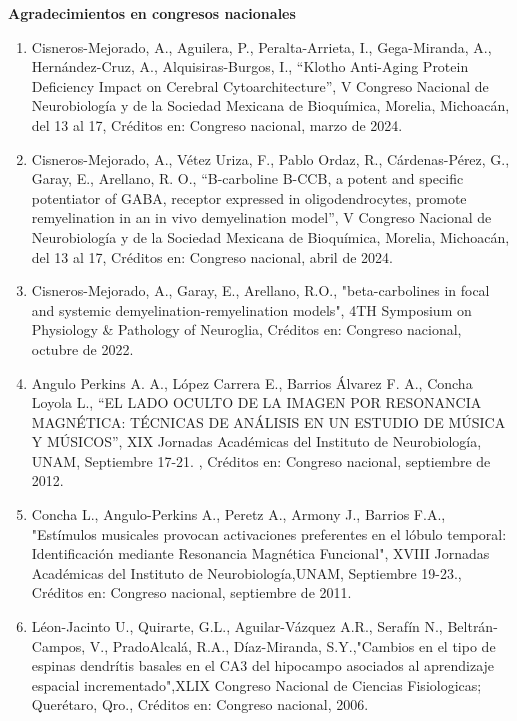 \textbf{Agradecimientos en congresos nacionales}

\hfill

\begin{enumerate}

\item Cisneros-Mejorado, A., Aguilera, P., Peralta-Arrieta, I., Gega-Miranda, A., Hernández-Cruz, A., Alquisiras-Burgos, I., 
“Klotho Anti-Aging Protein Deficiency Impact on Cerebral Cytoarchitecture”, V Congreso Nacional de Neurobiología y de la 
Sociedad Mexicana de Bioquímica, Morelia, Michoacán, del 13 al 17, Créditos en: Congreso nacional, marzo de 2024.

\item Cisneros-Mejorado, A., Vétez Uriza, F., Pablo Ordaz, R., Cárdenas-Pérez, G., Garay, E., Arellano, R. O., “B-carboline B-CCB, a potent and 
specific potentiator of GABA, receptor expressed in oligodendrocytes, promote 
remyelination in an in vivo demyelination model”, V Congreso Nacional de Neurobiología y de la Sociedad Mexicana de 
Bioquímica, Morelia, Michoacán, del 13 al 17, Créditos en: Congreso nacional, abril de 2024.

\item Cisneros-Mejorado, A., Garay, E., Arellano, R.O., "beta-carbolines in focal and systemic demyelination-remyelination 
models", 4TH Symposium on Physiology \& Pathology of Neuroglia, Créditos en: Congreso nacional, octubre de 2022.

\item Angulo Perkins A. A., López Carrera E., Barrios Álvarez F. A., Concha Loyola L., “EL LADO OCULTO DE LA IMAGEN POR 
RESONANCIA MAGNÉTICA: TÉCNICAS DE ANÁLISIS EN UN ESTUDIO DE MÚSICA Y MÚSICOS”, XIX Jornadas Académicas del Instituto de 
Neurobiología, UNAM, Septiembre 17-21. , Créditos en: Congreso nacional, septiembre de 2012.

\item Concha L., Angulo-Perkins A., Peretz A., Armony J., Barrios F.A., "Estímulos musicales provocan activaciones preferentes 
en el lóbulo temporal: Identificación mediante Resonancia Magnética Funcional", XVIII Jornadas Académicas del Instituto de 
Neurobiología,UNAM, Septiembre 19-23., Créditos en: Congreso nacional, septiembre de 2011.

\item Léon-Jacinto U., Quirarte, G.L., Aguilar-Vázquez A.R., Serafín N., Beltrán-Campos, V., PradoAlcalá, R.A., Díaz-Miranda, 
S.Y.,"Cambios en el tipo de espinas dendrítis basales en el CA3 del hipocampo asociados al aprendizaje espacial 
incrementado",XLIX Congreso Nacional de Ciencias Fisiologicas; Querétaro, Qro., Créditos en: Congreso nacional, 2006.


\end{enumerate}
